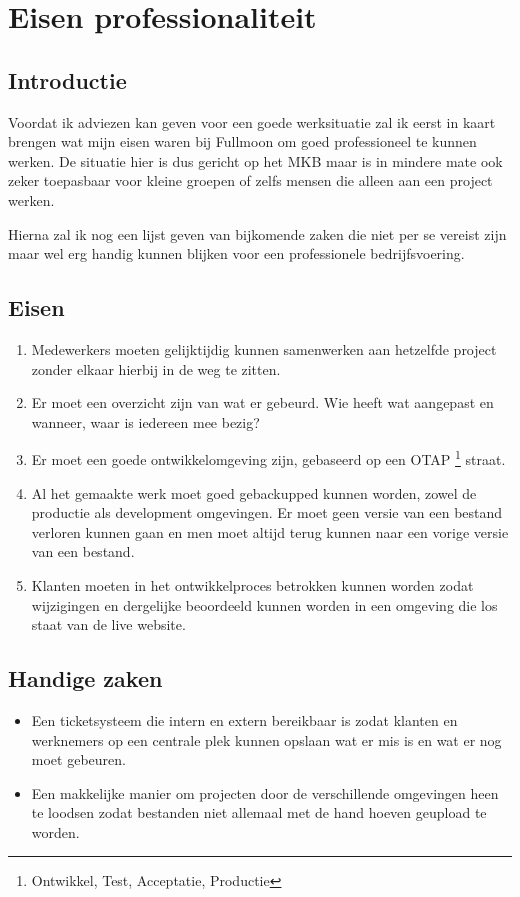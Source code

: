 \chapter{Eisen professionaliteit}

\section{Introductie}

Voordat ik adviezen kan geven voor een goede werksituatie zal ik eerst in kaart brengen wat mijn eisen waren bij Fullmoon om goed professioneel te kunnen werken. De situatie hier is dus gericht op het MKB maar is in mindere mate ook zeker toepasbaar voor kleine groepen of zelfs mensen die alleen aan een project werken.

Hierna zal ik nog een lijst geven van bijkomende zaken die niet per se vereist zijn maar wel erg handig kunnen blijken voor een professionele bedrijfsvoering.

\section{Eisen}

\begin{enumerate}
  \item Medewerkers moeten gelijktijdig kunnen samenwerken aan hetzelfde project zonder elkaar hierbij in de weg te zitten.
  \item Er moet een overzicht zijn van wat er gebeurd. Wie heeft wat aangepast en wanneer, waar is iedereen mee bezig?
  \item Er moet een goede ontwikkelomgeving zijn, gebaseerd op een OTAP \footnote{Ontwikkel, Test, Acceptatie, Productie} straat.
  \item Al het gemaakte werk moet goed gebackupped kunnen worden, zowel de productie als development omgevingen. Er moet geen versie van een bestand verloren kunnen gaan en men moet altijd terug kunnen naar een vorige versie van een bestand.
  \item Klanten moeten in het ontwikkelproces betrokken kunnen worden zodat wijzigingen en dergelijke beoordeeld kunnen worden in een omgeving die los staat van de live website.
\end{enumerate}

\section{Handige zaken}

\begin{itemize}
  \item Een ticketsysteem die intern en extern bereikbaar is zodat klanten en werknemers op een centrale plek kunnen opslaan wat er mis is en wat er nog moet gebeuren.
  \item Een makkelijke manier om projecten door de verschillende omgevingen heen te loodsen zodat bestanden niet allemaal met de hand hoeven geupload te worden.
\end{itemize}
